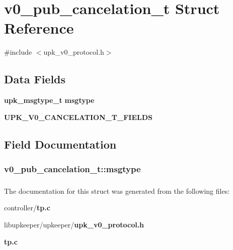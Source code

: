 \section{v0\_\-pub\_\-cancelation\_\-t Struct Reference}
\label{structv0__pub__cancelation__t}


{\ttfamily \#include $<$upk\_\-v0\_\-protocol.h$>$}

\subsection*{Data Fields}
\begin{DoxyCompactItemize}
\item 
{\bf upk\_\-msgtype\_\-t} {\bf msgtype}
\item 
{\bf UPK\_\-V0\_\-CANCELATION\_\-T\_\-FIELDS}
\end{DoxyCompactItemize}


\subsection{Field Documentation}
\subsubsection[{msgtype}]{ {\bf v0\_\-pub\_\-cancelation\_\-t::msgtype}}\label{structv0__pub__cancelation__t_a5bdb1596b51584d6babbf230dec4d63d}
\subsubsection[{UPK\_\-V0\_\-CANCELATION\_\-T\_\-FIELDS}]{}\label{structv0__pub__cancelation__t_aa666fc3762a64a16b9b92035631310bc}


The documentation for this struct was generated from the following files:\begin{DoxyCompactItemize}
\item 
controller/{\bf tp.c}\item 
libupkeeper/upkeeper/{\bf upk\_\-v0\_\-protocol.h}\item 
{\bf tp.c}\end{DoxyCompactItemize}
